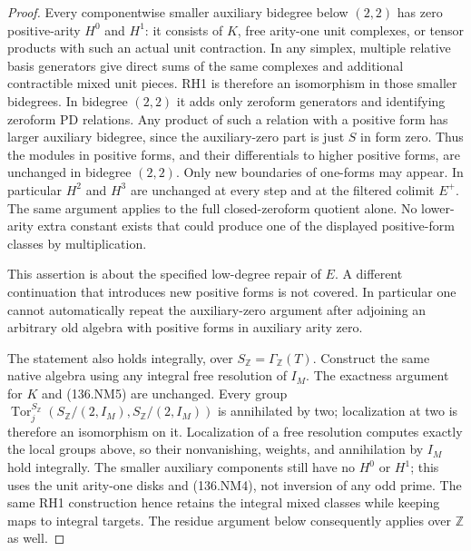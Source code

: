 \begin{proof}
Every componentwise smaller auxiliary bidegree below \((2,2)\)
has zero positive-arity \(H^0\) and \(H^1\): it consists
of \(K\), free arity-one unit complexes, or tensor products
with such an actual unit contraction. In any simplex, multiple
relative basis generators give direct sums of the same complexes
and additional contractible mixed unit pieces. RH1 is therefore
an isomorphism in those smaller bidegrees. In bidegree \((2,2)\)
it adds only zeroform generators and identifying zeroform PD
relations. Any product of such a relation with a positive form
has larger auxiliary bidegree, since the auxiliary-zero part
is just \(S\) in form zero. Thus the modules in positive forms,
and their differentials to higher positive forms, are unchanged
in bidegree \((2,2)\). Only new boundaries of one-forms may
appear. In particular \(H^2\) and \(H^3\) are unchanged
at every step and at the filtered colimit \(E^+\).
The same argument applies to the full closed-zeroform quotient
alone. No lower-arity extra constant exists that could produce
one of the displayed positive-form classes by multiplication.

This assertion is about the specified low-degree repair of
\(E\). A different continuation that introduces new positive
forms is not covered. In particular one cannot automatically
repeat the auxiliary-zero argument after adjoining an arbitrary
old algebra with positive forms in auxiliary arity zero.

The statement also holds integrally, over
\(S_{\mathbb Z}=\Gamma_{\mathbb Z}(T)\). Construct the same
native algebra using any integral free resolution of \(I_M\).
The exactness argument for \(K\) and (136.NM5) are unchanged.
Every group \(\operatorname{Tor}^{S_{\mathbb Z}}_j
(S_{\mathbb Z}/(2,I_M),S_{\mathbb Z}/(2,I_M))\) is annihilated
by two; localization at two is therefore an isomorphism on it.
Localization of a free resolution computes exactly the local
groups above, so their nonvanishing, weights, and annihilation
by \(I_M\) hold integrally. The smaller auxiliary components
still have no \(H^0\) or \(H^1\); this uses the unit
arity-one disks and (136.NM4), not inversion of any odd prime.
The same RH1 construction hence retains the integral mixed
classes while keeping maps to integral targets. The residue
argument below consequently applies over \(\mathbb Z\) as well.
\end{proof}

